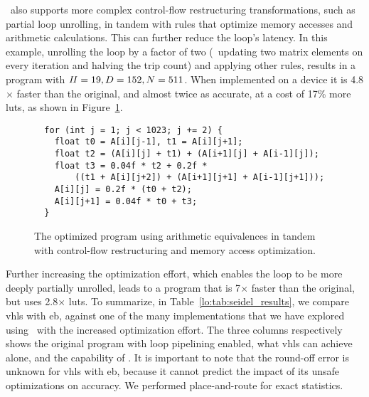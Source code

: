 \soap~also supports more complex control-flow restructuring transformations,
such as partial loop unrolling, in tandem with rules that optimize memory
accesses and arithmetic calculations.  This can further reduce the loop's
latency.  In this example, unrolling the loop by a factor of two (\ie~updating
two matrix elements on every iteration and halving the trip count) and applying
other rules, results in a program with $\mathit{II} = 19, D = 152, N = 511$.  When
implemented on a device it is 4.8$\times$ faster than the original, and
almost twice as accurate, at a cost of 17\% more \glspl{lut}, as shown in
Figure~\ref{lo:fig:seidel_prog_3}.

\begin{figure}[ht]
\begin{lstlisting}
  for (int j = 1; j < 1023; j += 2) {
    float t0 = A[i][j-1], t1 = A[i][j+1];
    float t2 = (A[i][j] + t1) + (A[i+1][j] + A[i-1][j]);
    float t3 = 0.04f * t2 + 0.2f *
        ((t1 + A[i][j+2]) + (A[i+1][j+1] + A[i-1][j+1]));
    A[i][j] = 0.2f * (t0 + t2);
    A[i][j+1] = 0.04f * t0 + t3;
  }
\end{lstlisting}
    \caption{The optimized program using arithmetic equivalences in tandem with
    control-flow restructuring and memory access optimization.}
    \label{lo:fig:seidel_prog_3}
\end{figure}

Further increasing the optimization effort, which enables the loop to be
more deeply partially unrolled, leads to a program that is 7$\times$ faster
than the original, but uses 2.8$\times$ \glspl{lut}.  To summarize, in
Table~\ref{lo:tab:seidel_results}, we compare \gls{vhls} with \gls{eb}, against
one of the many implementations that we have explored using \soap~with the
increased optimization effort.  The three columns respectively shows the
original program with loop pipelining enabled, what \gls{vhls} can achieve
alone, and the capability of \soap.  It is important to note that the round-off
error is unknown for \gls{vhls} with \gls{eb}, because it cannot predict the
impact of its unsafe optimizations on accuracy.  We performed place-and-route
for exact statistics.

